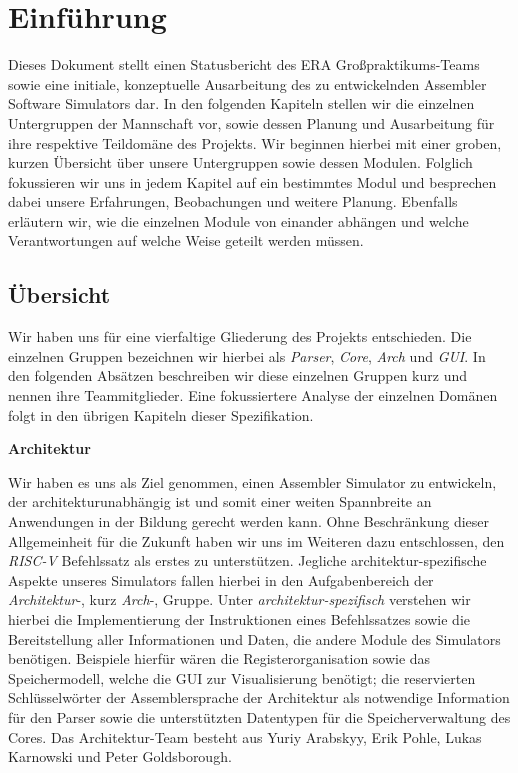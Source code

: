 \chapter{Einführung}

Dieses Dokument stellt einen Statusbericht des ERA Großpraktikums-Teams sowie
eine initiale, konzeptuelle Ausarbeitung des zu entwickelnden Assembler Software
Simulators dar. In den folgenden Kapiteln stellen wir die einzelnen Untergruppen
der Mannschaft vor, sowie dessen Planung und Ausarbeitung für ihre respektive
Teildomäne des Projekts. Wir beginnen hierbei mit einer groben, kurzen Übersicht
über unsere Untergruppen sowie dessen Modulen. Folglich fokussieren wir uns in
jedem Kapitel auf ein bestimmtes Modul und besprechen dabei unsere Erfahrungen,
Beobachungen und weitere Planung. Ebenfalls erläutern wir, wie die einzelnen
Module von einander abhängen und welche Verantwortungen auf welche Weise geteilt
werden müssen.

\section{Übersicht}

Wir haben uns für eine vierfaltige Gliederung des Projekts entschieden. Die
einzelnen Gruppen bezeichnen wir hierbei als \emph{Parser}, \emph{Core},
\emph{Arch} und \emph{GUI}. In den folgenden Absätzen beschreiben wir diese
einzelnen Gruppen kurz und nennen ihre Teammitglieder. Eine fokussiertere Analyse
der einzelnen Domänen folgt in den übrigen Kapiteln dieser Spezifikation.

\textbf{Architektur}

Wir haben es uns als Ziel genommen, einen Assembler Simulator zu entwickeln, der
architekturunabhängig ist und somit einer weiten Spannbreite an Anwendungen in
der Bildung gerecht werden kann. Ohne Beschränkung dieser Allgemeinheit für die
Zukunft haben wir uns im Weiteren dazu entschlossen, den \emph{RISC-V}
Befehlssatz als erstes zu unterstützen. Jegliche architektur-spezifische Aspekte
unseres Simulators fallen hierbei in den Aufgabenbereich der
\emph{Architektur}-, kurz \emph{Arch}-, Gruppe. Unter
\emph{architektur-spezifisch} verstehen wir hierbei die Implementierung der
Instruktionen eines Befehlssatzes sowie die Bereitstellung aller Informationen
und Daten, die andere Module des Simulators benötigen. Beispiele hierfür wären
die Registerorganisation sowie das Speichermodell, welche die GUI zur
Visualisierung benötigt; die reservierten Schlüsselwörter der Assemblersprache
der Architektur als notwendige Information für den Parser sowie die
unterstützten Datentypen für die Speicherverwaltung des Cores. Das
Architektur-Team besteht aus Yuriy Arabskyy, Erik Pohle, Lukas Karnowski und
Peter Goldsborough.

